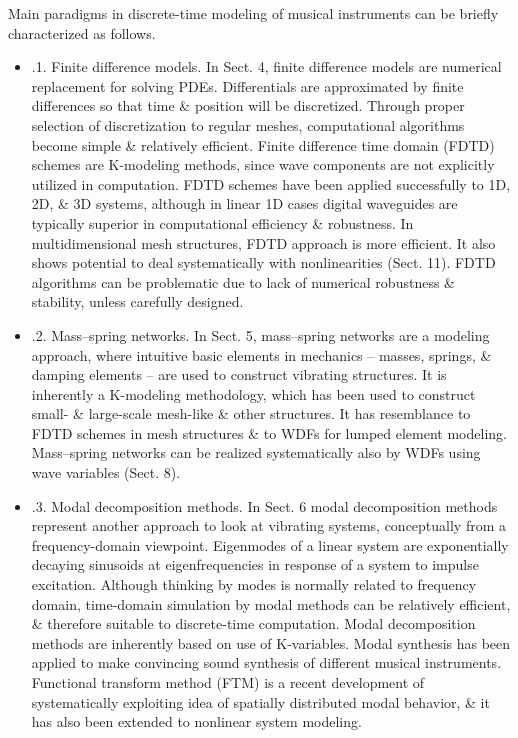 \documentclass{article}
\begin{document}
\begin{itemize}
\begin{itemize}
		Main paradigms in discrete-time modeling of musical instruments can be briefly characterized as follows.
		\begin{itemize}
			\item {.1. Finite difference models.} In Sect. 4, finite difference models are numerical replacement for solving PDEs. Differentials are approximated by finite differences so that time \& position will be discretized. Through proper selection of discretization to regular meshes, computational algorithms become simple \& relatively efficient. Finite difference time domain (FDTD) schemes are K-modeling methods, since wave components are not explicitly utilized in computation. FDTD schemes have been applied successfully to 1D, 2D, \& 3D systems, although in linear 1D cases digital waveguides are typically superior in computational efficiency \& robustness. In multidimensional mesh structures, FDTD approach is more efficient. It also shows potential to deal systematically with nonlinearities (Sect. 11). FDTD algorithms can be problematic due to lack of numerical robustness \& stability, unless carefully designed.
			\item {.2. Mass--spring networks.} In Sect. 5, mass--spring networks are a modeling approach, where intuitive basic elements in mechanics -- masses, springs, \& damping elements -- are used to construct vibrating structures. It is inherently a K-modeling methodology, which has been used to construct small- \& large-scale mesh-like \& other structures. It has resemblance to FDTD schemes in mesh structures \& to WDFs for lumped element modeling. Mass--spring networks can be realized systematically also by WDFs using wave variables (Sect. 8).
			\item {.3. Modal decomposition methods.} In Sect. 6 modal decomposition methods represent another approach to look at vibrating systems, conceptually from a frequency-domain viewpoint. Eigenmodes of a linear system are exponentially decaying sinusoids at eigenfrequencies in response of a system to impulse excitation. Although thinking by modes is normally related to frequency domain, time-domain simulation by modal methods can be relatively efficient, \& therefore suitable to discrete-time computation. Modal decomposition methods are inherently based on use of K-variables. Modal synthesis has been applied to make convincing sound synthesis of different musical instruments. Functional transform method (FTM) is a recent development of systematically exploiting idea of spatially distributed modal behavior, \& it has also been extended to nonlinear system modeling.

\end{itemize}
\end{itemize}
\end{itemize}
\end{document}
